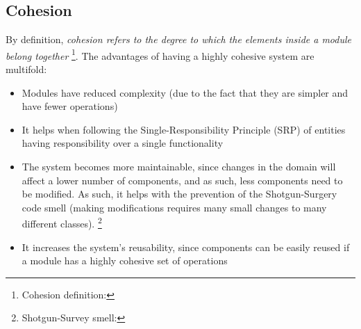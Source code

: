     \subsection{Cohesion}
        By definition, \textit{cohesion refers to the degree to which the elements inside a module belong together}
        \footnote{Cohesion definition: }.
        The advantages of having a highly cohesive system are multifold:
        \begin{itemize}
            \item Modules have reduced complexity (due to the fact that they are simpler and have fewer operations)
            
            \item It helps when following the Single-Responsibility Principle (SRP) of entities having responsibility over a single functionality 
            
            \item The system becomes more maintainable, since changes in the domain will affect a lower number of components, and as such, less components need to be modified. As such, it helps with the prevention of the Shotgun-Surgery code smell (making modifications requires many small changes to many different classes).
            \footnote{Shotgun-Survey smell:  }
            
            \item It increases the system's reusability, since components can be easily reused if a module has a highly cohesive set of operations
        \end{itemize}
                
